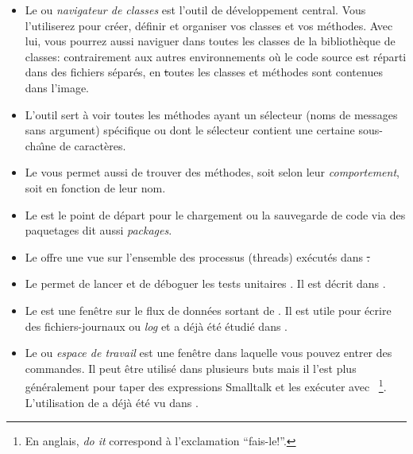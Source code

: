 \documentclass[a4paper,10pt,twoside]{book}
\begin{document}
\begin{itemize}
	\item Le {} ou \emph{navigateur de classes} est l'outil de d\'eveloppement central.
Vous l'utiliserez pour cr\'eer, d\'efinir et organiser vos classes et vos m\'ethodes. Avec lui, vous pourrez aussi naviguer dans toutes les classes de la biblioth\`eque de classes: contrairement aux autres environnements o\`u le code source est r\'eparti dans des fichiers s\'epar\'es, en \st toutes les classes et m\'ethodes sont contenues dans l'image.
	\item L'outil {} sert \`a voir toutes les m\'ethodes ayant un s\'electeur (noms de messages sans argument) sp\'ecifique ou dont le s\'electeur contient une certaine sous-cha\^{\i}ne de caract\`eres.
	
	\item Le {} vous permet aussi de trouver des m\'ethodes, soit selon leur \emph{comportement}, soit en fonction de leur nom.
	
	\item Le {} est le point de d\'epart pour le chargement ou la sauvegarde de code via des paquetages  dit aussi \emph{packages}.
	
	\item Le { offre une vue sur l'ensemble des processus (threads) ex\'ecut\'es dans \st.}
	
	\item Le {} permet de lancer et de d\'eboguer les tests unitaires \SUnit. Il est d\'ecrit dans .
	
	\item Le {} est une fen\^etre sur le flux de donn\'ees sortant de . Il est utile pour \'ecrire des fichiers-journaux ou \emph{log} et a d\'ej\`a \'et\'e \'etudi\'e dans .
	
	\item Le {} ou \emph{espace de travail} est une fen\^etre dans laquelle vous pouvez entrer des commandes.  
	Il peut \^etre utilis\'e dans plusieurs buts mais il l'est plus g\'en\'eralement pour taper des expressions Smalltalk et les ex\'ecuter avec 
~\footnote{En anglais, \emph{do it} correspond \`a l'exclamation ``fais-le!''.}. L'utilisation de  a déjà été vu dans .
\end{itemize}
\end{document}
